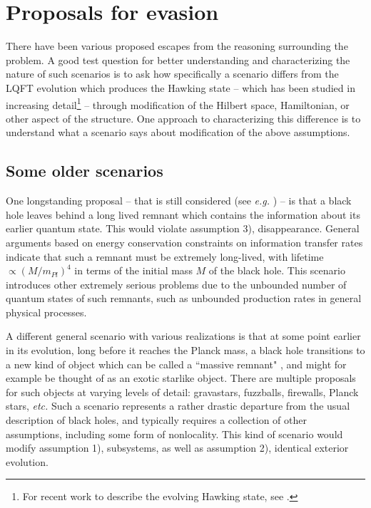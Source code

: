 \documentclass[12pt]{article}
\numberwithin{equation}{section}
\begin{document}
\section{Proposals for evasion}


There have been various proposed escapes from the reasoning surrounding the problem.  A good test question for better understanding and characterizing the nature of such scenarios is to ask how specifically a scenario differs from the LQFT evolution which produces the Hawking state --  which has been studied in increasing detail\footnote{For recent work to describe the evolving Hawking state, see \cite{SGsch,SG2d,GiPe}.} -- through modification of the Hilbert space, Hamiltonian, or other aspect of the structure.  One approach to characterizing this difference is to understand what a scenario says about modification of the above assumptions.


\subsection{Some older scenarios}

One longstanding proposal -- that is still considered (see {\it e.g.} \cite{Bianchi:2018mml}) -- is that a black hole leaves behind a long lived remnant which contains the information about its earlier quantum state.  This would violate assumption 3), disappearance.  General arguments based on energy conservation constraints on information transfer rates\cite{CaWi,Pres} indicate that such a remnant must be extremely long-lived, with lifetime $\propto (M/m_{Pl})^4$ in terms of the initial mass $M$ of the black hole.   This scenario introduces other extremely serious problems\cite{WABHIP,Susstrouble} due to the unbounded number of quantum states of such remnants, such as unbounded production rates in general physical processes.

A different general scenario with various realizations is that at some point earlier in its evolution, long before it reaches the Planck mass, a black hole transitions to a new kind of object which can be called a ``massive remnant" \cite{BHMR}, and might for example be thought of as an exotic starlike object.  There are multiple proposals for such objects at varying levels of detail:  gravastars\cite{MaMo}, fuzzballs\cite{fuzzrev}, firewalls\cite{AMPS}, Planck stars\cite{RoVi}, {\it etc.}  Such a scenario represents a rather drastic departure from the usual description of black holes, and typically requires a collection of other assumptions, including some form of nonlocality.
This kind of scenario would modify assumption 1), subsystems, as well as assumption 2), identical exterior evolution.
\end{document}
